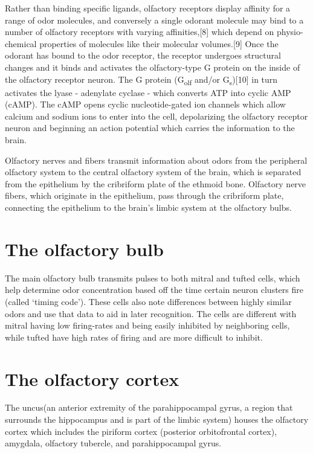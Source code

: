 \documentclass[]{book}
\begin{document}
Rather than binding specific ligands, olfactory receptors display affinity for a range of odor molecules, and conversely a single odorant molecule may bind to a number of olfactory receptors with varying affinities,{[}8{]} which depend on physio-chemical properties of molecules like their molecular volumes.{[}9{]} Once the odorant has bound to the odor receptor, the receptor undergoes structural changes and it binds and activates the olfactory-type G protein on the inside of the olfactory receptor neuron. The G protein (G\textsubscript{olf} and/or G\textsubscript{s}){[}10{]} in turn activates the lyase - adenylate cyclase - which converts ATP into cyclic AMP (cAMP). The cAMP opens cyclic nucleotide-gated ion channels which allow calcium and sodium ions to enter into the cell, depolarizing the olfactory receptor neuron and beginning an action potential which carries the information to the brain.

Olfactory nerves and fibers transmit information about odors from the peripheral olfactory system to the central olfactory system of the brain, which is separated from the epithelium by the cribriform plate of the ethmoid bone. Olfactory nerve fibers, which originate in the epithelium, pass through the cribriform plate, connecting the epithelium to the brain's limbic system at the olfactory bulbs.

\hypertarget{the-olfactory-bulb}{%
\section{The olfactory bulb}\label{the-olfactory-bulb}}

The main olfactory bulb transmits pulses to both mitral and tufted cells, which help determine odor concentration based off the time certain neuron clusters fire (called `timing code'). These cells also note differences between highly similar odors and use that data to aid in later recognition. The cells are different with mitral having low firing-rates and being easily inhibited by neighboring cells, while tufted have high rates of firing and are more difficult to inhibit.

\hypertarget{the-olfactory-cortex}{%
\section{The olfactory cortex}\label{the-olfactory-cortex}}

The uncus(an anterior extremity of the parahippocampal gyrus, a region that surrounds the hippocampus and is part of the limbic system) houses the olfactory cortex which includes the piriform cortex (posterior orbitofrontal cortex), amygdala, olfactory tubercle, and parahippocampal gyrus.
\end{document}
